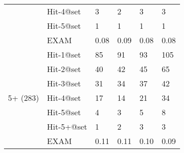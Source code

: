 \begin{table}[t]
{\begin{center}
\begin{tabular}{p{0.8cm}<{\centering}|p{1.33cm}<{\centering}|p{1cm}<{\centering}|p{0.7cm}<{\centering}|p{1cm}<{\centering}|p{1cm}<{\centering}}
										& Hit-4@set     & 3 & 2 & 3 & 3 \\
										& Hit-5@set     & 1 & 1 & 1 & 1 \\
										& EXAM          & 0.08 & 0.09 & 0.08 & 0.08 \\
				\hline
				\multirow{8}{*}{5+ (283)}  & Hit-1@set     & 85 & 91 & 93 & 105 \\
								 		& Hit-2@set     & 40 & 42 & 45 & 65 \\
										& Hit-3@set     & 31 & 34 & 37 & 42 \\
								 		& Hit-4@set     & 17 & 14 & 21 & 34 \\
										& Hit-5@set     & 4 & 3 & 5 & 8 \\
										& Hit-5+@set    & 1 & 2 & 3 & 3 \\
										& EXAM          & 0.11 & 0.11 & 0.10 & 0.09 \\
				\hline
			\end{tabular}
			
			\label{fig:rq1-1}
		\end{center}
	}
\end{table}







